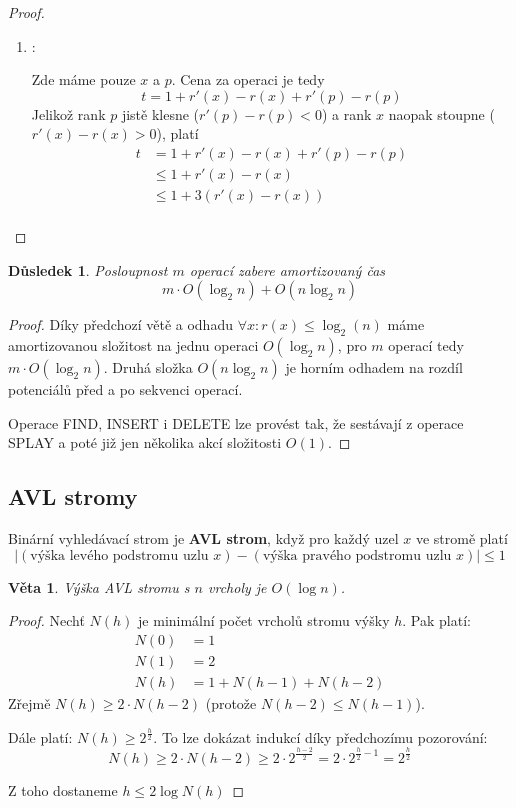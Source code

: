 \documentclass[11pt]{report} %
\newtheorem{theorem}{Věta}[section]
\newtheorem{implication}{Důsledek}[section]
\numberwithin{equation}{section}
\begin{document}
\begin{proof}
\begin{enumerate}
	
	
	\item \textbf{}:
	
	Zde máme pouze $x$ a $p$. Cena za operaci je tedy
	$$t = 1 + r'(x) - r(x) + r'(p) - r(p)$$
	Jelikož rank $p$ jistě klesne ($r'(p) - r(p) < 0$) a rank $x$ naopak stoupne ($r'(x) - r(x) > 0$), platí
	\begin{align*}
	t 	&= 1 + r'(x) - r(x) + r'(p) - r(p)\\ 
		&\leq 1 + r'(x) - r(x) \\
		&\leq 1 + 3(r'(x) - r(x))\\
	\end{align*}

	
\end{enumerate}
\end{proof}

\begin{implication}
Posloupnost $m$ operací zabere amortizovaný čas 
$$m\cdot O(\log_2n) + O(n\log_2n)$$
\end{implication}
\begin{proof}
Díky předchozí větě a odhadu $\forall x : r(x) \leq \log_2(n)$ máme amortizovanou složitost na jednu operaci $O(\log_2 n)$, pro $m$ operací tedy $m\cdot O(\log_2n)$. Druhá složka $O(n\log_2n)$ je horním odhadem na rozdíl potenciálů před a po sekvenci operací.

Operace FIND, INSERT i DELETE lze provést tak, že sestávají z operace SPLAY a poté již jen několika akcí složitosti $O(1)$.
\end{proof}



\subsection{AVL stromy}
Binární vyhledávací strom je \textbf{AVL strom}, když pro každý uzel $x$ ve stromě platí 
$$|(\text{výška levého podstromu uzlu $x$}) - (\text{výška pravého podstromu uzlu $x$})| \leq 1$$

\begin{theorem}
Výška AVL stromu s $n$ vrcholy je $O(\log n)$.
\end{theorem}
\begin{proof}
Nechť $N(h)$ je minimální počet vrcholů stromu výšky $h$. Pak platí:
\begin{align*}
	N(0) &= 1 \\
	N(1) &= 2 \\
	N(h) &= 1 + N(h - 1) + N(h - 2)
\end{align*}
Zřejmě $N(h) \geq 2\cdot N(h-2)$ (protože $N(h-2) \leq N(h-1)$). 

Dále platí: $N(h) \geq 2^{\frac{h}{2}}$. To lze dokázat indukcí díky předchozímu pozorování:
$$N(h) \geq 2\cdot N(h-2) \geq 2\cdot 2^{\frac{h-2}{2}} = 2\cdot 2^{\frac{h}{2} - 1} = 2^\frac{h}{2}$$

Z toho dostaneme $h \leq 2 \log N(h)$
\end{proof}
\end{document}
